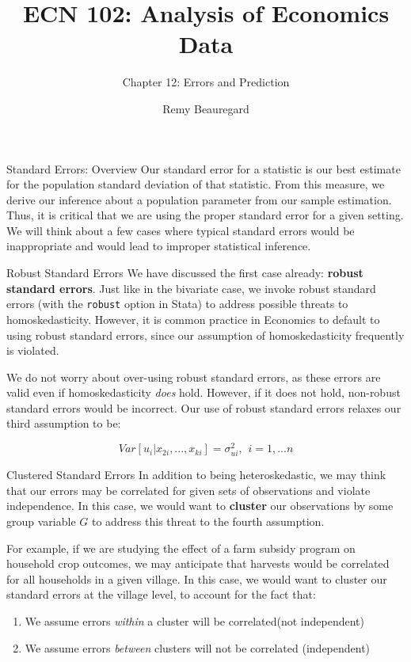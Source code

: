 \documentclass[
  ignorenonframetext,
  english,
]{beamer}
\title{\texorpdfstring{ECN 102: Analysis of Economics
Data}{ECN 102: Analysis of Economics Data}}
\subtitle{\texorpdfstring{Chapter 12: Errors and
Prediction}{Chapter 12: Errors and Prediction}}
\author{Remy Beauregard}
\date{}
\begin{document}
\frame{\titlepage}


\begin{frame}{Standard Errors: Overview}
\protect{}\label{standard-errors-overview}
Our standard error for a statistic is our best estimate for the
population standard deviation of that statistic. From this measure, we
derive our inference about a population parameter from our sample
estimation. Thus, it is critical that we are using the proper standard
error for a given setting. We will think about a few cases where typical
standard errors would be inappropriate and would lead to improper
statistical inference.
\end{frame}

\begin{frame}[fragile]{Robust Standard Errors}
\protect{}\label{robust-standard-errors}
We have discussed the first case already: \textbf{robust standard
errors}. Just like in the bivariate case, we invoke robust standard
errors (with the \texttt{robust} option in Stata) to address possible
threats to homoskedasticity. However, it is common practice in Economics
to default to using robust standard errors, since our assumption of
homoskedasticity frequently is violated.

We do not worry about over-using robust standard errors, as these errors
are valid even if homoskedasticity \emph{does} hold. However, if it does
not hold, non-robust standard errors would be incorrect. Our use of
robust standard errors relaxes our third assumption to be:

\[Var[u_i|x_{2i},...,x_{ki}]=\sigma^2_{ui},\hspace{5pt} i=1,...n\]
\end{frame}

\begin{frame}{Clustered Standard Errors}
\protect{}\label{clustered-standard-errors}
In addition to being heteroskedastic, we may think that our errors may
be correlated for given sets of observations and violate independence.
In this case, we would want to \textbf{cluster} our observations by some
group variable \(G\) to address this threat to the fourth assumption.

For example, if we are studying the effect of a farm subsidy program on
household crop outcomes, we may anticipate that harvests would be
correlated for all households in a given village. In this case, we would
want to cluster our standard errors at the village level, to account for
the fact that:

\begin{enumerate}
\item
  We assume errors \emph{within} a cluster will be correlated(not
  independent)
\item
  We assume errors \emph{between} clusters will not be correlated
  (independent)
\end{enumerate}
\end{frame}
\end{document}
